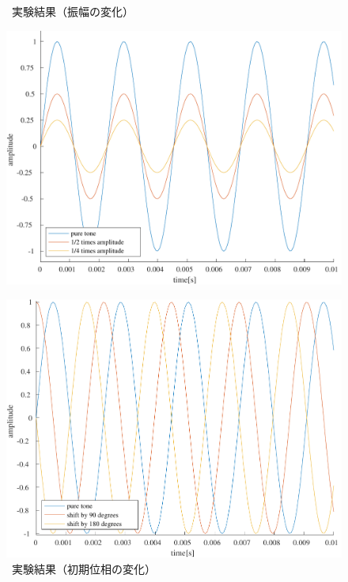 \begin{figure}[H]
    \centering
    \begin{minipage}[t]{.48\textwidth}
        \centering
        \caption{\kadaiab\ 実験結果（振幅の変化）}
        \label{fig:\kadaiab_結果_振幅}
        \includegraphics[keepaspectratio,width=\textwidth]{../../Figures/01_02_1.pdf}
    \end{minipage}
    \begin{minipage}[t]{.48\textwidth}
        \centering
        \caption{\kadaiab\ 実験結果（初期位相の変化）}
        \label{fig:\kadaiab_結果_初期位相}
        \includegraphics[keepaspectratio,width=\textwidth]{../../Figures/01_02_2.pdf}
    \end{minipage}
\end{figure}
\consideration
